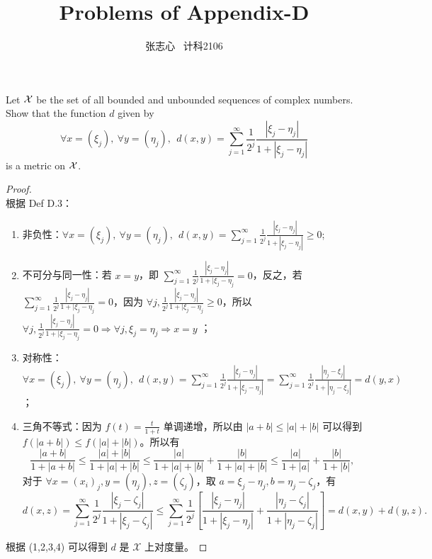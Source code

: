 \documentclass[lang=cn,a4paper,newtx,bibend=bibtex]{elegantpaper}
\title{Problems of Appendix-D}
\author{张志心 \ 计科2106}
\date{\zhdate{2024/05/28}}
\begin{document}
\maketitle

\begin{prob}[D.5]
  Let ${\cal X}$ be the set of all bounded and unbounded sequences
  of complex numbers. Show that the function $d$ given by
  \begin{equation*}
    \forall x=(\xi_j),\ \forall y=(\eta_j),\ \ 
    d(x,y) = \sum_{j=1}^{\infty} \frac{1}{2^j}
    \frac{|\xi_j-\eta_j|}{1+|\xi_j-\eta_j|}
  \end{equation*}
  is a metric on ${\cal X}$.
\end{prob}

\begin{proof}~~\\根据 Def D.3：
\begin{enumerate}
\item 非负性：\(\forall x=(\xi_j),\ \forall y=(\eta_j),\ \ 
    d(x,y) = \sum_{j=1}^{\infty} \frac{1}{2^j}
    \frac{|\xi_j-\eta_j|}{1+|\xi_j-\eta_j|}\geq 0\);
    \item 不可分与同一性：若 \(x = y\)，即 \(\sum_{j=1}^{\infty} \frac{1}{2^j}\frac{|\xi_j - \eta_j|}{1+|\xi_j - \eta_j} = 0\)，反之，若  \(\sum_{j=1}^{\infty} \frac{1}{2^j}\frac{|\xi_j - \eta_j|}{1+|\xi_j - \eta_j} = 0\)，因为 \(\forall j, \frac{1}{2^j}\frac{|\xi_j - \eta_j|}{1+|\xi_j - \eta_j} \geq 0\)，所以 \(\forall j, \frac{1}{2^j}\frac{|\xi_j - \eta_j|}{1+|\xi_j - \eta_j} = 0\Rightarrow \forall j, \xi_j = \eta_j \Rightarrow x = y\) ；
    \item  对称性：\(\forall x=(\xi_j),\ \forall y=(\eta_j),\ \ 
    d(x,y) = \sum_{j=1}^{\infty} \frac{1}{2^j}
    \frac{|\xi_j-\eta_j|}{1+|\xi_j-\eta_j|} = \sum_{j=1}^{\infty} \frac{1}{2^j}
    \frac{|\eta_j-\xi_j|}{1+|\eta_j-\xi_j|} = d(y,x)\)；
    \item 三角不等式：因为 $f(t) = \frac{t}{1+t}$ 单调递增，所以由 $|a+b| \leq |a|+|b|$ 可以得到 $f(|a+b|) \leq f(|a|+|b|)$。所以有
\[\frac{|a+b|}{1+|a+b|} \leq \frac{|a|+|b|}{1+|a|+|b|}\leq \frac{|a|}{1+|a|+|b|} + \frac{|b|}{1+|a|+|b|} \leq \frac{|a|}{1+|a|} + \frac{|b|}{1+|b|},\]
对于 $\forall x = (x_i)_j, y=(\eta_j), z=(\zeta_j)$，取 $a = \xi_j - \eta_j, b = \eta_j - \zeta_j$，有
\[d(x,z) = \sum_{j=1}^{\infty} \frac{1}{2^j} \frac{|\xi_j - \zeta_j|}{1+|\xi_j - \zeta_j|}\leq \sum_{j=1}^{\infty} \frac{1}{2^j} \left[\frac{|\xi_j - \eta_j|}{1+|\xi_j-\eta_j|} + \frac{|\eta_j - \zeta_j|}{1+|\eta_j-\zeta_j|}\right] = d(x, y) + d(y, z).\]
\end{enumerate}
根据 (1,2,3,4) 可以得到 $d$ 是 $\mathcal{X}$ 上对度量。
\end{proof}
\end{document}
